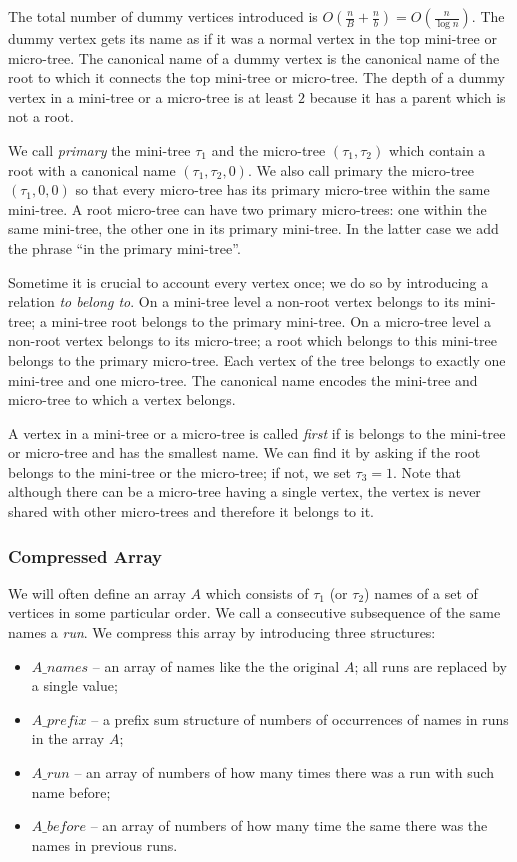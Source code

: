 The total number of dummy vertices introduced is $O\left(\frac{n}{B} + \frac{n}{b}\right) = O\left(\frac{n}{\log n}\right)$.
The dummy vertex gets its name as if it was a normal vertex in the top mini-tree or micro-tree.
The canonical name of a dummy vertex is the canonical name of the root to which it connects the top mini-tree or micro-tree.
The depth of a dummy vertex in a mini-tree or a micro-tree is at least $2$ because it has a parent which is not a root.

We call \emph{primary} the mini-tree $\tau_1$ and the micro-tree $(\tau_1, \tau_2)$ which contain a root with a canonical name $(\tau_1, \tau_2, 0)$.
We also call primary the micro-tree $(\tau_1, 0, 0)$ so that every micro-tree has its primary micro-tree within the same mini-tree.
A root micro-tree can have two primary micro-trees: one within the same mini-tree, the other one in its primary mini-tree.
In the latter case we add the phrase ``in the primary mini-tree''.

Sometime it is crucial to account every vertex once; we do so by introducing a relation \emph{to belong to}.
On a mini-tree level a non-root vertex belongs to its mini-tree; a mini-tree root belongs to the primary mini-tree.
On a micro-tree level a non-root vertex belongs to its micro-tree; a root which belongs to this mini-tree belongs to the primary micro-tree.
Each vertex of the tree belongs to exactly one mini-tree and one micro-tree.
The canonical name encodes the mini-tree and micro-tree to which a vertex belongs.

A vertex in a mini-tree or a micro-tree is called \emph{first} if is belongs to the mini-tree or micro-tree and has the smallest name.
We can find it by asking if the root belongs to the mini-tree or the micro-tree; if not, we set $\tau_3 = 1$.
Note that although there can be a micro-tree having a single vertex, the vertex is never shared with other micro-trees and therefore it belongs to it.

\subsubsection{Compressed Array}

We will often define an array $A$ which consists of $\tau_1$ (or $\tau_2$) names of a set of vertices in some particular order.
We call a consecutive subsequence of the same names a \emph{run}.
We compress this array by introducing three structures:
\begin{itemize}
	\item $A\_names$ -- an array of names like the the original $A$; all runs are replaced by a single value;
	\item $A\_prefix$ -- a prefix sum structure of numbers of occurrences of names in runs in the array $A$;
	\item $A\_run$ -- an array of numbers of how many times there was a run with such name before;
	\item $A\_before$ -- an array of numbers of how many time the same there was the names in previous runs.
\end{itemize}

